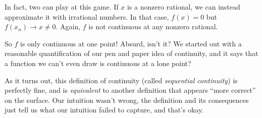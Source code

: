 In fact, two can play at this game. If $x$ is a nonzero rational, we can instead approximate it with irrational numbers. In that case, $f(x) = 0$ but $f(x_n) \rightarrow x \neq 0$. Again, $f$ is not continuous at any nonzero rational.

So $f$ is only continuous at one point! Absurd, isn't it? We started out with a reasonable quantification of our pen and paper idea of continuity, and it says that a function we can't even draw is continuous at a lone point?

As it turns out, this definition of continuity (called \emph{sequential continuity}) is perfectly fine, and is \emph{equivalent} to another definition that appears ``more correct'' on the surface. Our intuition wasn't wrong, the definition and its consequences just tell us what our intuition failed to capture, and that's okay.
